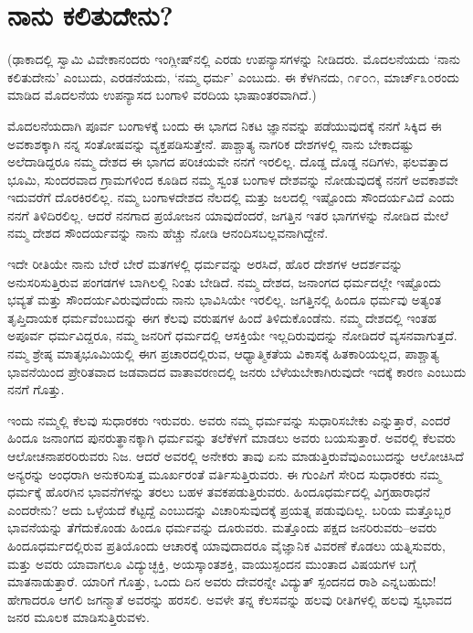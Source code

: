 
\chapter{ನಾನು ಕಲಿತುದೇನು?}

(ಢಾಕಾದಲ್ಲಿ ಸ್ವಾಮಿ ವಿವೇಕಾನಂದರು ಇಂಗ್ಲೀಷ್​ನಲ್ಲಿ ಎರಡು ಉಪನ್ಯಾಸಗಳನ್ನು ನೀಡಿದರು. ಮೊದಲನೆಯದು ‘ನಾನು ಕಲಿತುದೇನು’ ಎಂಬುದು, ಎರಡನೆಯದು, ‘ನಮ್ಮ ಧರ್ಮ’ ಎಂಬುದು. ಈ ಕೆಳಗಿನದು, ೧೯೦೧, ಮಾರ್ಚ್​ ೩೦ರಂದು ಮಾಡಿದ ಮೊದಲನೆಯ ಉಪನ್ಯಾಸದ ಬಂಗಾಳಿ ವರದಿಯ ಭಾಷಾಂತರವಾಗಿದೆ.)

\vskip 5pt

ಮೊದಲನೆಯದಾಗಿ ಪೂರ್ವ ಬಂಗಾಳಕ್ಕೆ ಬಂದು ಈ ಭಾಗದ ನಿಕಟ ಜ್ಞಾನವನ್ನು ಪಡೆಯುವುದಕ್ಕೆ ನನಗೆ ಸಿಕ್ಕಿದ ಈ ಅವಕಾಶಕ್ಕಾಗಿ ನನ್ನ ಸಂತೋಷವನ್ನು ವ್ಯಕ್ತಪಡಿಸುತ್ತೇನೆ. ಪಾಶ್ಚಾತ್ಯ ನಾಗರಿಕ ದೇಶಗಳಲ್ಲಿ ನಾನು ಬೇಕಾದಷ್ಟು ಅಲೆದಾಡಿದ್ದರೂ ನಮ್ಮ ದೇಶದ ಈ ಭಾಗದ ಪರಿಚಯವೇ ನನಗೆ ಇರಲಿಲ್ಲ. ದೊಡ್ಡ ದೊಡ್ಡ ನದಿಗಳು, ಫಲವತ್ತಾದ ಭೂಮಿ, ಸುಂದರವಾದ ಗ್ರಾಮಗಳಿಂದ ಕೂಡಿದ ನಮ್ಮ ಸ್ವಂತ ಬಂಗಾಳ ದೇಶವನ್ನು ನೋಡುವುದಕ್ಕೆ ನನಗೆ ಅವಕಾಶವೇ ಇದುವರೆಗೆ ದೊರಕಿರಲಿಲ್ಲ. ನಮ್ಮ ಬಂಗಾಳದೇಶದ ನೆಲದಲ್ಲಿ ಮತ್ತು ಜಲದಲ್ಲಿ ಇಷ್ಟೊಂದು ಸೌಂದರ್ಯವಿದೆ ಎಂದು ನನಗೆ ತಿಳಿದಿರಲಿಲ್ಲ. ಆದರೆ ನನಗಾದ ಪ್ರಯೋಜನ ಯಾವುದೆಂದರೆ, ಜಗತ್ತಿನ ಇತರ ಭಾಗಗಳನ್ನು ನೋಡಿದ ಮೇಲೆ ನಮ್ಮ ದೇಶದ ಸೌಂದರ್ಯವನ್ನು ನಾನು ಹೆಚ್ಚು ನೋಡಿ ಆನಂದಿಸಬಲ್ಲವನಾಗಿದ್ದೇನೆ.

\vskip 5pt

ಇದೇ ರೀತಿಯೇ ನಾನು ಬೇರೆ ಬೇರೆ ಮತಗಳಲ್ಲಿ ಧರ್ಮವನ್ನು ಅರಸಿದೆ, ಹೊರ ದೇಶಗಳ ಆದರ್ಶವನ್ನು ಅನುಸರಿಸುತ್ತಿರುವ ಪಂಗಡಗಳ ಬಾಗಿಲಲ್ಲಿ ನಿಂತು ಬೇಡಿದೆ. ನಮ್ಮ ದೇಶದ, ಜನಾಂಗದ ಧರ್ಮದಲ್ಲೇ ಇಷ್ಟೊಂದು ಭವ್ಯತೆ ಮತ್ತು ಸೌಂದರ್ಯವಿರುವುದೆಂದು ನಾನು ಭಾವಿಸಿಯೇ ಇರಲಿಲ್ಲ. ಜಗತ್ತಿನಲ್ಲಿ ಹಿಂದೂ ಧರ್ಮವು ಅತ್ಯಂತ ತೃಪ್ತಿದಾಯಕ ಧರ್ಮವೆಂಬುದನ್ನು ಈಗ ಕೆಲವು ವರುಷಗಳ ಹಿಂದೆ ತಿಳಿದುಕೊಂಡೆನು. ನಮ್ಮ ದೇಶದಲ್ಲಿ ಇಂತಹ ಅಪೂರ್ವ ಧರ್ಮವಿದ್ದರೂ, ನಮ್ಮ ಜನರಿಗೆ ಧರ್ಮದಲ್ಲಿ ಆಸಕ್ತಿಯೇ ಇಲ್ಲದಿರುವುದನ್ನು ನೋಡಿದರೆ ವ್ಯಸನವಾಗುತ್ತದೆ. ನಮ್ಮ ಶ್ರೇಷ್ಠ ಮಾತೃಭೂಮಿಯಲ್ಲಿ ಈಗ ಪ್ರಚಾರದಲ್ಲಿರುವ, ಆಧ್ಯಾತ್ಮಿಕತೆಯ ವಿಕಾಸಕ್ಕೆ ಹಿತಕಾರಿಯಲ್ಲದ, ಪಾಶ್ಚಾತ್ಯ ಭಾವನೆಯಿಂದ ಪ್ರೇರಿತವಾದ ಜಡವಾದದ ವಾತಾವರಣದಲ್ಲಿ ಜನರು ಬೆಳೆಯಬೇಕಾಗಿರುವುದೇ ಇದಕ್ಕೆ ಕಾರಣ ಎಂಬುದು ನನಗೆ ಗೊತ್ತು.

\vskip 5pt

ಇಂದು ನಮ್ಮಲ್ಲಿ ಕೆಲವು ಸುಧಾರಕರು ಇರುವರು. ಅವರು ನಮ್ಮ ಧರ್ಮವನ್ನು ಸುಧಾರಿಸಬೇಕು ಎನ್ನುತ್ತಾರೆ, ಎಂದರೆ ಹಿಂದೂ ಜನಾಂಗದ ಪುನರುತ್ಥಾನಕ್ಕಾಗಿ ಧರ್ಮವನ್ನು ತಲೆಕೆಳಗೆ ಮಾಡಲು ಅವರು ಬಯಸುತ್ತಾರೆ. ಅವರಲ್ಲಿ ಕೆಲವರು ಆಲೋಚನಾಪರರಿರುವರು ನಿಜ. ಆದರೆ ಅವರಲ್ಲಿ ಅನೇಕರು ತಾವು ಏನು ಮಾಡುತ್ತಿರುವೆವು\break ಎಂಬುದನ್ನು ಆಲೋಚಿಸಿದೆ ಅನ್ಯರನ್ನು ಅಂಧರಾಗಿ ಅನುಕರಿಸುತ್ತ ಮೂರ್ಖರಂತೆ ವರ್ತಿಸುತ್ತಿರುವರು. ಈ ಗುಂಪಿಗೆ ಸೇರಿದ ಸುಧಾರಕರು ನಮ್ಮ ಧರ್ಮಕ್ಕೆ ಹೊರಗಿನ ಭಾವನೆಗಳನ್ನು ತರಲು ಬಹಳ ತವಕಪಡುತ್ತಿರುವರು. ಹಿಂದೂಧರ್ಮದಲ್ಲಿ ವಿಗ್ರಹಾರಾಧನೆ ಎಂದರೇನು? ಅದು ಒಳ್ಳೆಯದೆ ಕೆಟ್ಟದ್ದೆ ಎಂಬುದನ್ನು ವಿಚಾರಿಸುವುದಕ್ಕೆ ಪ್ರಯತ್ನ ಪಡುವುದಿಲ್ಲ. ಬರಿಯ ಮತ್ತೊಬ್ಬರ ಭಾವನೆಯನ್ನು ತೆಗೆದುಕೊಂಡು ಹಿಂದೂ ಧರ್ಮವನ್ನು ದೂರುವರು. ಮತ್ತೊಂದು ಪಕ್ಷದ ಜನರಿರುವರು–ಅವರು ಹಿಂದೂಧರ್ಮದಲ್ಲಿರುವ ಪ್ರತಿಯೊಂದು ಆಚಾರಕ್ಕೆ ಯಾವುದಾದರೂ ವೈಜ್ಞಾನಿಕ ವಿವರಣೆ ಕೊಡಲು ಯತ್ನಿಸುವರು, ಮತ್ತು ಅವರು ಯಾವಾಗಲೂ ವಿದ್ಯುಚ್ಛಕ್ತಿ, ಅಯಸ್ಕಾಂತಶಕ್ತಿ, ವಾಯುಸ್ಪಂದನ ಮುಂತಾದ ವಿಷಯಗಳ ಬಗ್ಗೆ ಮಾತನಾಡುತ್ತಾರೆ. ಯಾರಿಗೆ ಗೊತ್ತು, ಒಂದು ದಿನ ಅವರು ದೇವರನ್ನೇ ವಿದ್ಯುತ್​ ಸ್ಪಂದನದ ರಾಶಿ ಎನ್ನಬಹುದು! ಹೇಗಾದರೂ ಆಗಲಿ ಜಗನ್ಮಾತೆ ಅವರನ್ನು ಹರಸಲಿ. ಅವಳೇ ತನ್ನ ಕೆಲಸವನ್ನು ಹಲವು ರೀತಿಗಳಲ್ಲಿ ಹಲವು ಸ್ವಭಾವದ ಜನರ ಮೂಲಕ ಮಾಡಿಸುತ್ತಿರುವಳು.

